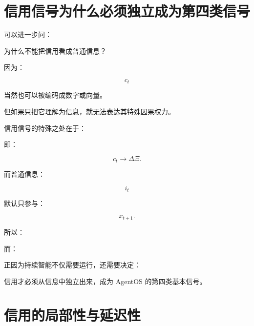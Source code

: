 \section{信用信号为什么必须独立成为第四类信号}

可以进一步问：

为什么不能把信用看成普通信息？

因为：

\[
c_t
\]

当然也可以被编码成数字或向量。

但如果只把它理解为信息，就无法表达其特殊因果权力。

信用信号的特殊之处在于：

\begin{statementbox}
\centering
{}
\end{statementbox}

即：

\[
c_t
\rightarrow
\Delta\Xi.
\]

而普通信息：

\[
i_t
\]

默认只参与：

\[
x_{t+1}.
\]

所以：

\begin{statementbox}
\centering
{}
\end{statementbox}

而：

\begin{statementbox}
\centering
{}
\end{statementbox}

正因为持续智能不仅需要运行，还需要决定：

\begin{statementbox}
\centering
{}
\end{statementbox}

信用才必须从信息中独立出来，成为 AgentOS 的第四类基本信号。

\section{信用的局部性与延迟性}

